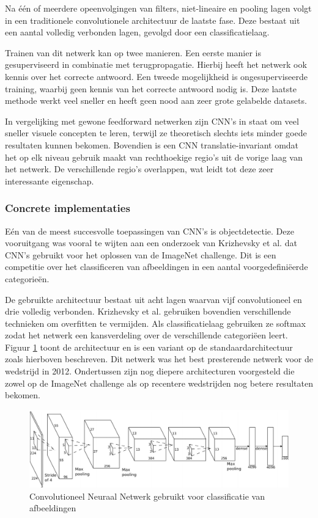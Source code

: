 Na \'e\'en of meerdere opeenvolgingen van filters, niet-lineaire en pooling lagen volgt in een traditionele convolutionele architectuur de laatste fase. Deze bestaat uit een aantal volledig verbonden lagen, gevolgd door een classificatielaag.

Trainen van dit netwerk kan op twee manieren. Een eerste manier is gesuperviseerd in combinatie met terugpropagatie. Hierbij heeft het netwerk ook kennis over het correcte antwoord. Een tweede mogelijkheid is ongesuperviseerde training, waarbij geen kennis van het correcte antwoord nodig is. Deze laatste methode werkt veel sneller en heeft geen nood aan zeer grote gelabelde datasets. 

In vergelijking met gewone feedforward netwerken zijn CNN's in staat om veel sneller visuele concepten te leren, terwijl ze theoretisch slechts iets minder goede resultaten kunnen bekomen.
Bovendien is een CNN translatie-invariant omdat het op elk niveau gebruik maakt van rechthoekige regio's uit de vorige laag van het netwerk. De verschillende regio's overlappen, wat leidt tot deze zeer interessante eigenschap.

\subsubsection[]{Concrete implementaties}
E\'en van de meest succesvolle toepassingen van CNN's is objectdetectie. Deze vooruitgang was vooral te wijten aan een onderzoek van Krizhevsky et al.\cite{Krizhevsky2012a} dat CNN's gebruikt voor het oplossen van de ImageNet challenge\cite{Russakovsky2014}.
Dit is een competitie over het classificeren van afbeeldingen in een aantal voorgedefini\"eerde categorie\"en. 

De gebruikte architectuur bestaat uit acht lagen waarvan vijf convolutioneel en drie volledig verbonden. Krizhevsky et al.\cite{Krizhevsky2012a} gebruiken bovendien verschillende technieken om overfitten te vermijden. Als classificatielaag gebruiken ze softmax zodat het netwerk een kansverdeling over de verschillende categori\"een leert. Figuur \ref{fig:AlexNet} toont de architectuur en  is een variant op de standaardarchitectuur zoals hierboven beschreven. Dit netwerk was het best presterende netwerk voor de wedstrijd in 2012. Ondertussen zijn nog diepere architecturen voorgesteld die zowel op de ImageNet challenge als op recentere wedstrijden nog betere resultaten bekomen.

\begin{figure}[tb]
	\centering
	\includegraphics[width=\linewidth]{Images/cnn.PNG}
	\caption{Convolutioneel Neuraal Netwerk gebruikt voor classificatie van afbeeldingen\cite{Krizhevsky2012a}}
	\label{fig:AlexNet}
\end{figure}

